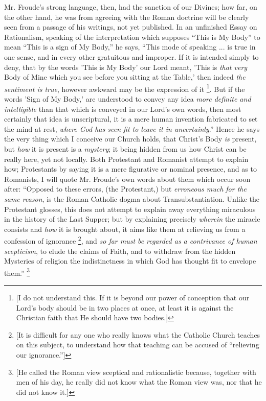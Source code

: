 Mr. Froude's strong language, then, had the
sanction of our Divines; how far, on the other hand, he was from
agreeing with the Roman doctrine will be clearly seen from a passage
of his writings, not yet published. In an unfinished Essay on
Rationalism, speaking of the interpretation which supposes ``This is My
Body'' to mean ``This is a sign of My Body,'' he says, ``This mode of
speaking ... is true in one sense, and in every other gratuitous and
improper. If it is intended simply to deny, that by the words 'This is
My Body' our Lord meant, 'This is \emph{that very} Body of Mine which
you see before you sitting at the Table,' then indeed \emph{the sentiment
is true}, however awkward may be the expression of it \footnote{[I do not understand this. If it is beyond our power of conception
that our Lord's body should be in two places at once, at least it is
against the Christian faith that He should have two bodies.]}. But if the words 'Sign of My Body,' are understood to convey
any idea \emph{more definite and intelligible} than that which is
conveyed in our Lord's own words, then most certainly that idea is
unscriptural, it is a mere human invention fabricated to set the mind
at rest, \emph{where God has seen fit to leave it in uncertainly}.''
Hence he says the very thing which I conceive our Church holds, that
Christ's Body \emph{is} present, but \emph{how} it is present is a \emph{mystery};
it being hidden from us how Christ can be really here, yet not
locally. Both Protestant and Romanist attempt to explain how;
Protestants by saying it is a mere figurative or nominal presence, and
as to Romanists, I will quote Mr. Froude's own words about them which
occur soon after: ``Opposed to these errors, (the Protestant,) but \emph{erroneous
much for the same reason}, is the Roman Catholic dogma about
Transubstantiation. Unlike the Protestant glosses, this does not
attempt to explain away everything miraculous in the history of the
Last Supper; but by explaining precisely \emph{wherein} the miracle
consists and \emph{how} it is brought about, it aims like them at
relieving us from a confession of ignorance \footnote{[It is difficult for any one who really knows what the Catholic Church
teaches on this subject, to understand how that teaching can be
accused of ``relieving our ignorance.'']}, and \emph{so far must be} \emph{regarded as a contrivance
of human scepticism}, to elude the claims of Faith, and to withdraw
from the hidden Mysteries of religion the indistinctness in which God
has thought fit to envelope them.'' \footnote{[He called the Roman view sceptical and rationalistic because,
together with men of his day, he really did not know what the Roman
view was, nor that he did not know it.]}

